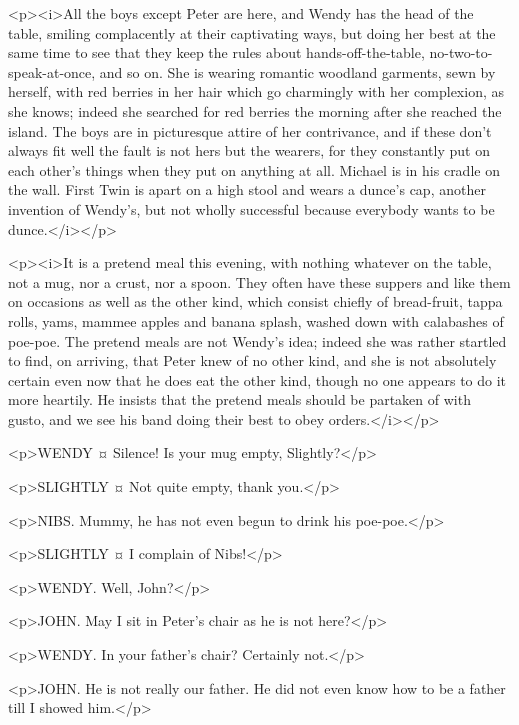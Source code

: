 <p><i>All the boys except Peter are here, and Wendy has the head of the table, smiling complacently at their captivating ways, but doing her best at the same time to see that they keep the rules about hands-off-the-table, no-two-to-speak-at-once, and so on. She is wearing romantic woodland garments, sewn by herself, with red berries in her hair which go charmingly with her complexion, as she knows; indeed she searched for red berries the morning after she reached the island. The boys are in picturesque attire of her contrivance, and if these don't always fit well the fault is not hers but the wearers, for they constantly put on each other's things when they put on anything at all. Michael is in his cradle on the wall. First Twin is apart on a high stool and wears a dunce's cap, another invention of Wendy's, but not wholly successful because everybody wants to be dunce.</i></p>

<p><i>It is a pretend meal this evening, with nothing whatever on the table, not a mug, nor a crust, nor a spoon. They often have these suppers and like them on occasions as well as the other kind, which consist chiefly of bread-fruit, tappa rolls, yams, mammee apples and banana splash, washed down with calabashes of poe-poe. The pretend meals are not Wendy's idea; indeed she was rather startled to find, on arriving, that Peter knew of no other kind, and she is not absolutely certain even now that he does eat the other kind, though no one appears to do it more heartily. He insists that the pretend meals should be partaken of with gusto, and we see his band doing their best to obey orders.</i></p>

<p>WENDY ¤
Silence! Is your mug empty, Slightly?</p>

<p>SLIGHTLY ¤
Not quite empty, thank you.</p>

<p>NIBS. Mummy, he has not even begun to drink his poe-poe.</p>

<p>SLIGHTLY ¤
I complain of Nibs!</p>


<p>WENDY. Well, John?</p>

<p>JOHN. May I sit in Peter's chair as he is not here?</p>

<p>WENDY. In your father's chair? Certainly not.</p>

<p>JOHN. He is not really our father. He did not even know how to be a father till I showed him.</p>

